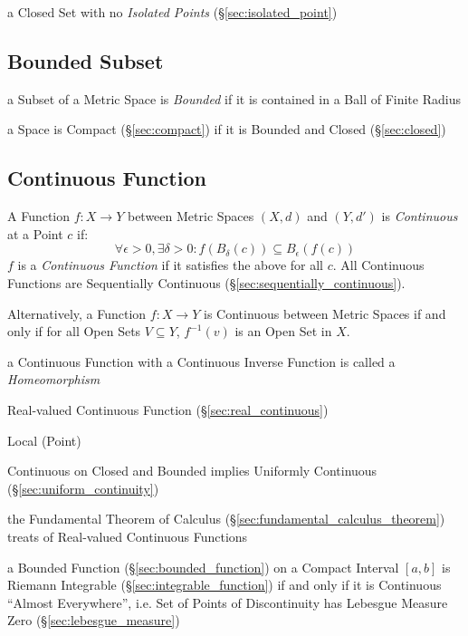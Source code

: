 a Closed Set with no \emph{Isolated Points}
(\S\ref{sec:isolated_point})



\subsection{Bounded Subset}\label{sec:bounded_subset}

a Subset of a Metric Space is \emph{Bounded} if it is contained in a Ball of
Finite Radius

a Space is Compact (\S\ref{sec:compact}) if it is Bounded and Closed
(\S\ref{sec:closed})



\subsection{Continuous Function}\label{sec:continuous_function}

A Function $f : X \rightarrow Y$ between Metric Spaces $(X,d)$ and
$(Y,d')$ is \emph{Continuous} at a Point $c$ if:
\[
  \forall \epsilon > 0, \exists \delta > 0 :
  f (B_{\delta}(c)) \subseteq B_{\epsilon}(f(c))
\]
$f$ is a \emph{Continuous Function} if it satisfies the above for all
$c$. All Continuous Functions are Sequentially Continuous
(\S\ref{sec:sequentially_continuous}).

Alternatively, a Function $f: X \rightarrow Y$ is Continuous between
Metric Spaces if and only if for all Open Sets $V \subseteq Y$,
$f^{-1}(v)$ is an Open Set in $X$.

a Continuous Function with a Continuous Inverse Function is called a
\emph{Homeomorphism}

Real-valued Continuous Function (\S\ref{sec:real_continuous})

Local (Point)

Continuous on Closed and Bounded implies Uniformly Continuous
(\S\ref{sec:uniform_continuity})

the Fundamental Theorem of Calculus (\S\ref{sec:fundamental_calculus_theorem})
treats of Real-valued Continuous Functions

a Bounded Function (\S\ref{sec:bounded_function}) on a Compact Interval $[a,b]$
is Riemann Integrable (\S\ref{sec:integrable_function}) if and only if it is
Continuous ``Almost Everywhere'', i.e. Set of Points of Discontinuity has
Lebesgue Measure Zero (\S\ref{sec:lebesgue_measure})

